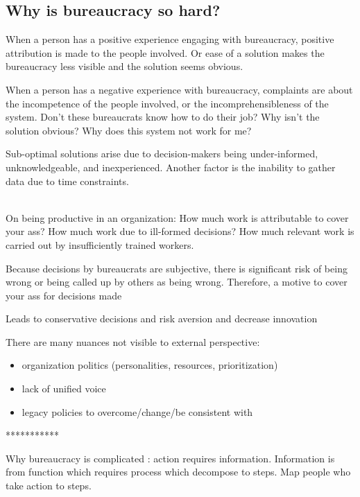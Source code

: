 \subsection{Why is bureaucracy so hard?}

When a person has a positive experience engaging with bureaucracy, positive attribution is made to the people involved. Or ease of a solution makes the bureaucracy less visible and the solution seems obvious. 


When a person has a negative experience with bureaucracy, complaints are about the incompetence of the people involved, or the incomprehensibleness of the system. Don't these bureaucrats know how to do their job? Why isn't the solution obvious? Why does this system not work for me?


Sub-optimal solutions arise due to decision-makers being under-informed, unknowledgeable, and inexperienced. Another factor is the inability to gather data due to time constraints.



\ \\

On being productive in an organization:
How much work is attributable to cover your ass? How much work due to ill-formed decisions? How much relevant work is carried out by insufficiently trained workers. 

Because decisions by bureaucrats are subjective, there is significant risk of being wrong or being called up by others as being wrong. Therefore, a motive to cover your ass for decisions made

Leads to conservative decisions and risk aversion and decrease innovation


There are many nuances not visible to external perspective:
\begin{itemize}
    \item organization politics (personalities, resources, prioritization)
\item lack of unified voice
\item legacy policies to overcome/change/be consistent with
\end{itemize}

***********

Why bureaucracy is complicated : action requires information. Information is from function which requires process which decompose to steps. Map people who take action to steps.
